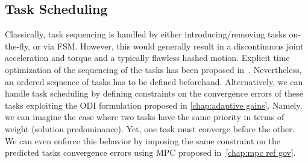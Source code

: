 	\subsection*{Task Scheduling} 
	Classically, task sequencing is handled by either introducing/removing tasks on-the-fly, or via FSM. However, this would generally result in a discontinuous joint acceleration and torque and a typically flawless hashed motion. Explicit time optimization of the sequencing of the tasks has been proposed in~\cite{keith2009iros}. Nevertheless, an ordered sequence of tasks has to be defined beforehand. Alternatively, we can handle task scheduling by defining constraints on the convergence errors of these tasks exploiting the ODI formulation proposed in \cref{chap:adaptive gains}. Namely, we can imagine the case where two tasks have the same priority in terms of weight (solution predominance). Yet, one task must converge before the other. We can even enforce this behavior by imposing the same constraint on the predicted tasks convergence errors using MPC proposed in~\cref{chap:mpc ref gov}.
